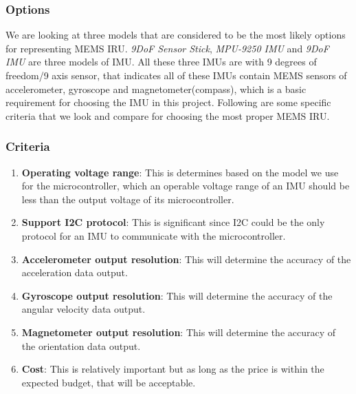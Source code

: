 \subsubsection{Options}
We are looking at three models that are considered to be the most likely options for representing MEMS IRU.
\textit{9DoF Sensor Stick}\cite{sensorStick}, \textit{MPU-9250 IMU}\cite{mpu9250} and \textit{9DoF IMU}\cite{9dof} are three models of IMU.
All these three IMUs are with 9 degrees of freedom/9 axis sensor, that indicates all of these IMUs contain MEMS sensors of accelerometer, gyroscope and magnetometer(compass), which is a basic requirement for choosing the IMU in this project.
Following are some specific criteria that we look and compare for choosing the most proper MEMS IRU.\\

\subsubsection{Criteria}
\begin{enumerate}
	\item \textbf{Operating voltage range}: This is determines based on the model we use for the microcontroller, which an operable voltage range of an IMU should be less than the output voltage of its microcontroller.
	\item \textbf{Support I2C protocol}: This is significant since I2C could be the only protocol for an IMU to communicate with the microcontroller.
	\item \textbf{Accelerometer output resolution}: This will determine the accuracy of the acceleration data output.
	\item \textbf{Gyroscope output resolution}: This will determine the accuracy of the angular velocity data output.
	\item \textbf{Magnetometer output resolution}: This will determine the accuracy of the orientation data output.
	\item \textbf{Cost}: This is relatively important but as long as the price is within the expected budget, that will be acceptable.\\
\end{enumerate}

